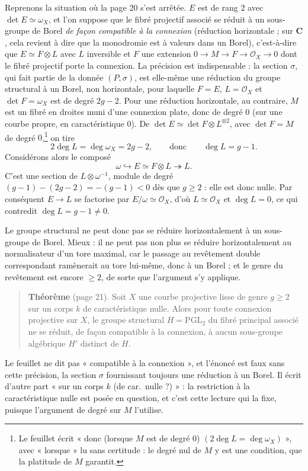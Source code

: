 \documentclass[11pt,a4paper]{article}
\begin{document}
Reprenons la situation où la page 20 s'est arrêtée. $E$ est de rang $2$ avec
$\det E \simeq \omega_X$, et l'on suppose que le fibré projectif associé se
réduit à un sous-groupe de Borel \emph{de façon compatible à la connexion}
(réduction horizontale ; sur $\mathbf{C}$, cela revient à dire que la
monodromie est à valeurs dans un Borel), c'est-à-dire que $E \simeq F \otimes
L$ avec $L$ inversible et $F$ une extension $0 \to M \to F \to \mathcal{O}_X
\to 0$ dont le fibré projectif porte la connexion. La précision est
indispensable : la section $\sigma$, qui fait partie de la donnée $(P,
\sigma)$, est elle-même une réduction du groupe structural à un Borel, non
horizontale, pour laquelle $F = E$, $L = \mathcal{O}_X$ et $\det F = \omega_X$
est de degré $2g-2$. Pour une réduction horizontale, au contraire, $M$ est
un fibré en droites muni d'une connexion plate, donc de degré $0$ (sur une
courbe propre, en caractéristique $0$). De
$\det E \simeq \det F \otimes L^{\otimes 2}$, avec $\det F = M$ de degré
$0$,\footnote{Le feuillet écrit « donc (lorsque $M$ est de degré $0$)
$(2\deg L = \deg \omega_X)$ », avec « lorsque » lu sans certitude : le degré
nul de $M$ y est une condition, que la platitude de $M$ garantit.} on tire
\[
  2 \deg L = \deg \omega_X = 2g-2, \qquad \text{donc} \qquad \deg L = g-1 .
\]
Considérons alors le composé
\[
  \omega \hookrightarrow E \simeq F \otimes L
  \twoheadrightarrow L .
\]
C'est une section de $L \otimes \omega^{-1}$, module de degré
$(g-1) - (2g-2) = -(g-1) < 0$ dès que $g \geqslant 2$ : elle est donc nulle.
Par conséquent $E \to L$ se factorise par $E/\omega \simeq \mathcal{O}_X$,
d'où $L \simeq \mathcal{O}_X$ et $\deg L = 0$, ce qui contredit
$\deg L = g-1 \neq 0$.

Le groupe structural ne peut donc pas se réduire horizontalement à un
sous-groupe de Borel. Mieux : il ne peut pas non plus se réduire
horizontalement au normalisateur d'un tore maximal,
car le passage au revêtement double correspondant ramènerait au tore lui-même,
donc à un Borel ; et le genre du revêtement est encore $\geqslant 2$, de sorte
que l'argument s'y applique.

\begin{quote}
\textbf{Théorème} (page 21). Soit $X$ une courbe projective lisse de genre
$g \geqslant 2$ sur un corps $k$ de caractéristique nulle. Alors pour toute
connexion projective sur $X$, le groupe structural $H = \mathrm{PGL}_2$ du
fibré principal associé ne se réduit, de façon compatible à la connexion, à
aucun sous-groupe algébrique $H'$ distinct de $H$.
\end{quote}
Le feuillet ne dit pas « compatible à la connexion », et l'énoncé est faux
sans cette précision, la section $\sigma$ fournissant toujours une réduction
à un Borel. Il écrit d'autre part « sur un corps $k$ (de car.\ nulle ?) » :
la restriction à la caractéristique nulle est posée en question, et c'est
cette lecture qui la fixe, puisque l'argument de degré sur $M$ l'utilise.
\end{document}
